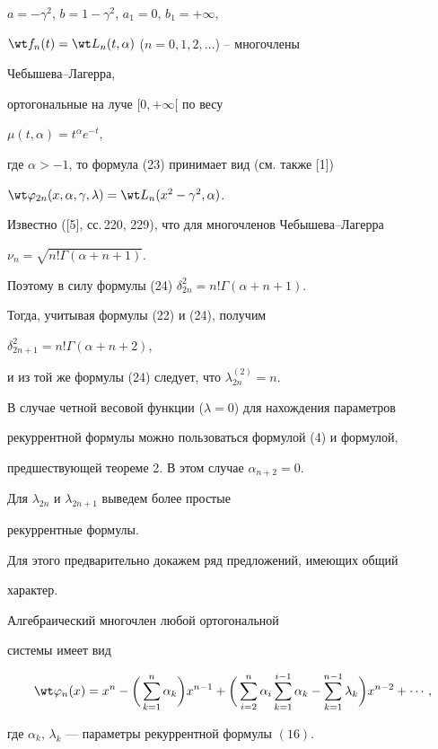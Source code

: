 $a=-\gamma^2$, $b=1-\gamma^2$, $a_1=0$, $b_1=+\infty$, 


$\wt f_n(t)=\wt L_n(t,\alpha)$ ($n=0,1,2,\dotsc$) -- многочлены 


Чебышева--Лагерра, 


ортогональные на луче $[0,+\infty[$ по весу 


$\mu(t,\alpha)=t^\alpha e^{-t}$, 


где $\alpha>-1$, то формула (23) принимает вид (см. также [1]) 


$\wt\varphi_{2n}(x,\alpha,\gamma,\lambda)=\wt 


L_n(x^2-\gamma^2,\alpha)$. 


 


Известно ([5], сс.\,220, 229), что для многочленов Чебышева--Лагерра 


$\nu_n=\sqrt{n!\Gamma(\alpha+n+1)}$.


Поэтому в силу формулы (24)\; $\delta^2_{2n}=n!\Gamma(\alpha+n+1)$. 


Тогда, учитывая формулы (22) и (24), получим 


$\delta^2_{2n+1}=n!\Gamma(\alpha+n+2)$, 


и из той же формулы (24) следует, что $\lambda^{(2)}_{2n}=n$. 


 


В случае четной весовой функции ($\lambda=0$) для нахождения параметров 


рекуррентной формулы можно пользоваться формулой (4) и формулой,


предшествующей теореме 2. В этом случае $\alpha_{n+2}=0$. 


 


Для $\lambda_{2n}$ и $\lambda_{2n+1}$ выведем более простые 


рекуррентные формулы. 


Для этого предварительно докажем ряд предложений, имеющих общий 


характер. 


 


\begin{lem} 


Алгебраический многочлен любой ортогональной 


системы имеет вид 


$$ 


\wt\varphi_n(x)=x^n-\bigg(\sum^n_{k=1}\alpha_k \bigg)x^{n-1}+ 


\bigg(\sum^n_{i=2}\alpha_i\sum^{i-1}_{k=1}\alpha_k- 


\sum^{n-1}_{k=1}\lambda_k \bigg)x^{n-2}+\dotsb, 


$$ 


где $\alpha_k$, $\lambda_k$ --- параметры рекуррентной формулы $(16)$. 


\end{lem} 


